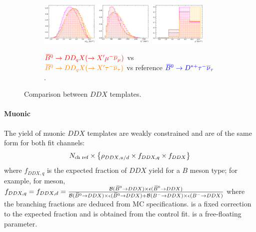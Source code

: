 \begin{figure}[!htb]
    \begin{subfigure}{\textwidth}
        \centering
        \includegraphics[width=0.3\textwidth]{figs-fit-fit-templates/histo-comp/Dst_iso_DstTau__vs__Dst_iso_dDDMu__vs__D0_iso_dDDTau__m2miss.pdf}
        \includegraphics[width=0.3\textwidth]{figs-fit-fit-templates/histo-comp/Dst_iso_DstTau__vs__Dst_iso_dDDMu__vs__D0_iso_dDDTau__el.pdf}
        \includegraphics[width=0.3\textwidth]{figs-fit-fit-templates/histo-comp/Dst_iso_DstTau__vs__Dst_iso_dDDMu__vs__D0_iso_dDDTau__q2.pdf}
        \caption{
            $\textcolor{red}{{{\kern 0.18em\overline{\kern -0.18em B}}{}^0} \rightarrow D D_q X (\rightarrow X'{\mu^-}{{\overline{\nu}}_\mu})}$
            vs
            $\textcolor{orange}{{{\kern 0.18em\overline{\kern -0.18em B}}{}^0} \rightarrow D D_q X (\rightarrow X'{\tau^-}{{\overline{\nu}}_\tau})}$
            vs reference
            $\textcolor{blue}{{{\kern 0.18em\overline{\kern -0.18em B}}{}^0} \rightarrow {\ensuremath{{D}^{*+}}}{\ensuremath{\tau^-}}{\ensuremath{{\overline{\nu}}_\tau}}}$.
        }
    \end{subfigure}

    \caption{Comparison between $DDX$ templates.}
    \label{fig:ddx-templates}
\end{figure}

\paragraph{Muonic}
The yield of muonic $DDX$ templates are weakly constrained and are of the same
form for both fit channels:
\begin{equation}
    N_\text{ch ref} \times \left\{
        \rho_{DDX,u/d} \times f_{DDX,q} \times f_{DDX}
    \right\}
\end{equation}
where $f_{DDX,q}$ is the expected fraction of $DDX$ yield for a $B$ meson type;
for example, for \Bzb meson,
$f_{DDX,q} = f_{DDX,d} =
\frac{\mathcal{B}({{\kern 0.18em\overline{\kern -0.18em B}}{}^0} \rightarrow DDX) \times \epsilon({{\kern 0.18em\overline{\kern -0.18em B}}{}^0} \rightarrow DDX)}{
\mathcal{B}({{\kern 0.18em\overline{\kern -0.18em B}}{}^0} \rightarrow DDX) \times \epsilon({{\kern 0.18em\overline{\kern -0.18em B}}{}^0} \rightarrow DDX) +
\mathcal{B}({{{B}^-}} \rightarrow DDX) \times \epsilon({{{B}^-}} \rightarrow DDX)
}$
where the branching fractions are deduced from MC specifications.
\fitDDXuvsd is a fixed correction to the expected fraction and is obtained from
the control fit.
\fitfDDX is a free-floating parameter.

